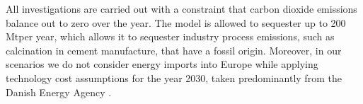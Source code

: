 
All investigations are carried out with a constraint that carbon dioxide
emissions balance out to zero over the year. The model is allowed to sequester
up to 200 Mt\co per year, which allows it to sequester industry process
emissions, such as calcination in cement manufacture, that have a fossil origin.
Moreover, in our scenarios we do not consider energy imports into Europe while
applying technology cost assumptions for the year 2030, taken predominantly from
the Danish Energy Agency \cite{}.


